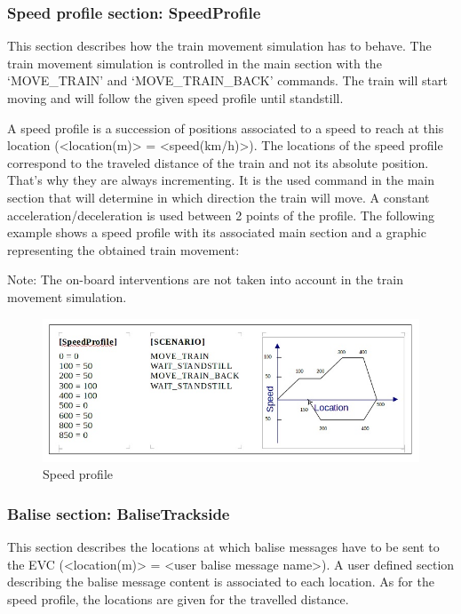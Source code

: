 \documentclass{template/openetcs}
\begin{document}
\subsubsection{Speed profile section: SpeedProfile}

	This section describes how the train movement simulation has to behave. The train movement simulation is controlled in the main section with the ‘MOVE\_TRAIN’ and ‘MOVE\_TRAIN\_BACK’ commands. The train will start moving and will follow the given speed profile until standstill.
	
	A speed profile is a succession of positions associated to a speed to reach at this location (<location(m)> = <speed(km/h)>). The locations of the speed profile correspond to the traveled distance of the train and not its absolute position. That's why they are always incrementing. It is the used command in the main section that will determine in which direction the train will move. 
	A constant acceleration/deceleration is used between 2 points of the profile.
	The following example shows a speed profile with its associated main section and a graphic representing the obtained train movement: 
	
	Note: The on-board interventions are not taken into account in the train movement simulation.
	
	\begin{figure}[!h]
		\centering
		\includegraphics[width=\textwidth]{image/test_runner_speed_profile}
		\caption{Speed profile}
		\label{fig:Speed profile}
	\end{figure}
	\subsubsection{Balise section: BaliseTrackside}

	This section describes the locations at which balise messages have to be sent to the EVC (<location(m)> = <user balise message name>). A user defined section describing the balise message content is associated to each location. As for the speed profile, the locations are given for the travelled distance.
	
\end{document}
